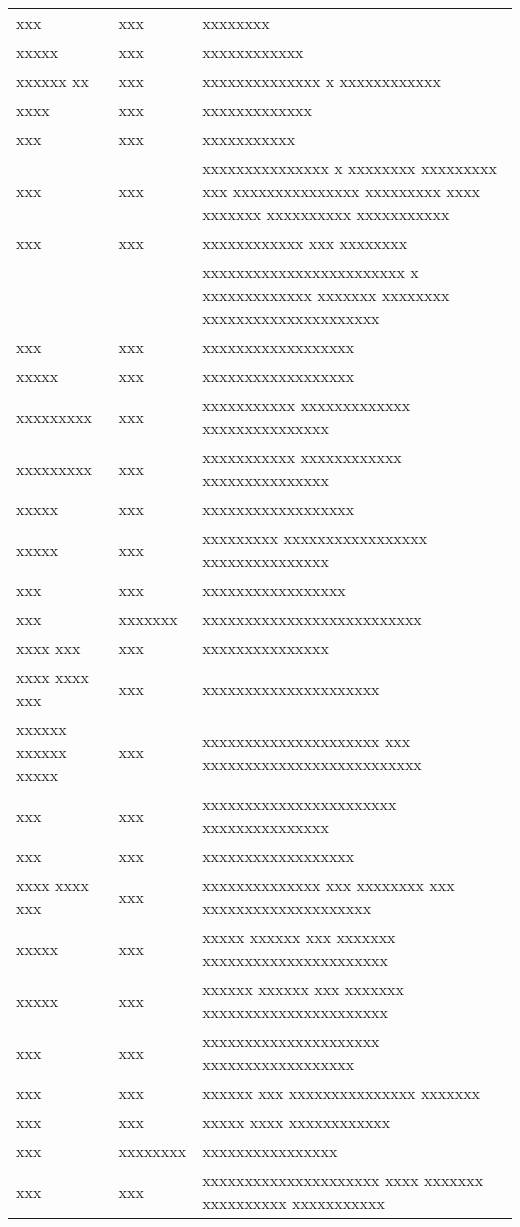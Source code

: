 \begin{longtable}{@{}L{0.15\textwidth}@{\hspace{\columnsep}}L{0.15\textwidth}@{\hspace{\columnsep}}L{0.7\columnsep}@{}}
xxx & xxx & xxxxxxxx \\
xxxxx & xxx & xxxxxxxxxxxx \\
xxxxxx xx & xxx & xxxxxxxxxxxxxx x xxxxxxxxxxxx \\
xxxx & xxx & xxxxxxxxxxxxx \\
xxx & xxx & xxxxxxxxxxx \\
xxx & xxx & xxxxxxxxxxxxxxx x xxxxxxxx xxxxxxxxx xxx xxxxxxxxxxxxxxx xxxxxxxxx xxxx xxxxxxx xxxxxxxxxx xxxxxxxxxxx \\
xxx & xxx & xxxxxxxxxxxx xxx xxxxxxxx \\
 & & xxxxxxxxxxxxxxxxxxxxxxxx x xxxxxxxxxxxxx xxxxxxx xxxxxxxx xxxxxxxxxxxxxxxxxxxxx \\
xxx & xxx & xxxxxxxxxxxxxxxxxx \\
xxxxx & xxx & xxxxxxxxxxxxxxxxxx \\
xxxxxxxxx & xxx & xxxxxxxxxxx xxxxxxxxxxxxx xxxxxxxxxxxxxxx \\
xxxxxxxxx & xxx & xxxxxxxxxxx xxxxxxxxxxxx xxxxxxxxxxxxxxx \\
xxxxx & xxx & xxxxxxxxxxxxxxxxxx \\
xxxxx & xxx & xxxxxxxxx xxxxxxxxxxxxxxxxx xxxxxxxxxxxxxxx \\
xxx & xxx & xxxxxxxxxxxxxxxxx \\
xxx & xxxxxxx & xxxxxxxxxxxxxxxxxxxxxxxxxx \\
xxxx xxx & xxx & xxxxxxxxxxxxxxx \\
xxxx xxxx xxx & xxx & xxxxxxxxxxxxxxxxxxxxx \\
xxxxxx xxxxxx xxxxx & xxx & xxxxxxxxxxxxxxxxxxxxx xxx xxxxxxxxxxxxxxxxxxxxxxxxxx \\
xxx & xxx & xxxxxxxxxxxxxxxxxxxxxxx xxxxxxxxxxxxxxx \\
xxx & xxx & xxxxxxxxxxxxxxxxxx \\
xxxx xxxx xxx & xxx & xxxxxxxxxxxxxx xxx xxxxxxxx xxx xxxxxxxxxxxxxxxxxxxx \\
xxxxx & xxx & xxxxx xxxxxx xxx xxxxxxx xxxxxxxxxxxxxxxxxxxxxx \\
xxxxx & xxx & xxxxxx xxxxxx xxx xxxxxxx xxxxxxxxxxxxxxxxxxxxxx \\
xxx & xxx & xxxxxxxxxxxxxxxxxxxxx xxxxxxxxxxxxxxxxxx \\
xxx & xxx & xxxxxx xxx xxxxxxxxxxxxxxx xxxxxxx \\
xxx & xxx & xxxxx xxxx xxxxxxxxxxxx \\
xxx & xxxxxxxx & xxxxxxxxxxxxxxxx \\
xxx & xxx & xxxxxxxxxxxxxxxxxxxxx xxxx xxxxxxx xxxxxxxxxx xxxxxxxxxxx \\

\end{longtable}
